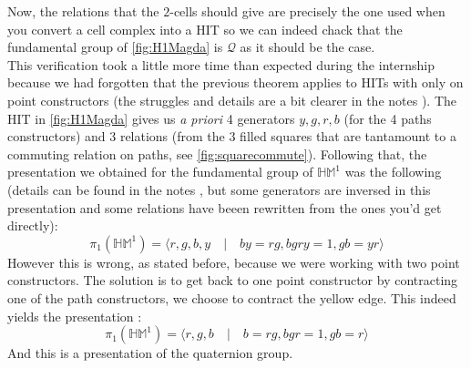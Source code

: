 \documentclass{report}
\begin{document}
Now, the relations that the $2$-cells should give are precisely the one used when you convert a cell complex into a HIT so we can indeed chack that the fundamental group of \ref{fig:H1Magda} is $\mathcal{Q}$ as it should be the case.\\
This verification took a little more time than expected during the internship because we had forgotten that the previous theorem applies to HITs with only on point constructors (the struggles and details are a bit clearer in the notes \cite{QuaternionPresentation}). The HIT in \ref{fig:H1Magda} gives us \textit{a priori} 4 generators $y,g,r,b$ (for the 4 paths constructors) and 3 relations (from the 3 filled squares that are tantamount to a commuting relation on paths, see \ref{fig:squarecommute}). Following that, the presentation we obtained for the fundamental group of $\mathbb{HM}^1$ was the following (details can be found in the notes \cite{QuaternionPresentation}, but some generators are inversed in this presentation and some relations have beeen rewritten from the ones you'd get directly):
$$ \pi_1(\mathbb{HM}^1) = \langle r,g,b,y \quad \vert \quad by=rg, bgry=1, gb = yr \rangle$$
However this is wrong, as stated before, because we were working with two point constructors. The solution is to get back to one point constructor by contracting one of the path constructors, we choose to contract the yellow edge. This indeed yields the presentation : 
$$ \pi_1(\mathbb{HM}^1) = \langle r,g,b \quad \vert \quad b=rg, bgr=1, gb = r \rangle$$
And this is a presentation of the quaternion group.
\end{document}
